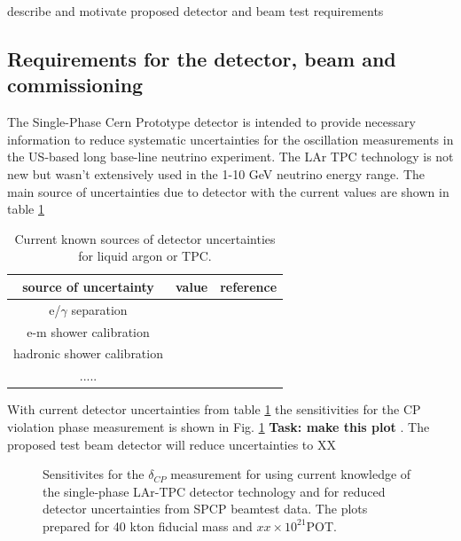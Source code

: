 describe and motivate proposed detector and beam test requirements 


\subsection{Requirements for the detector, beam and commissioning}
The Single-Phase Cern Prototype detector is intended to provide necessary information to reduce systematic uncertainties for the oscillation measurements in the US-based long base-line neutrino experiment.   The LAr TPC technology is not new but wasn't extensively used in the 1-10 GeV neutrino energy range.  The main source of uncertainties due to detector with the current values are shown in table \ref{table:deterr}


\begin{table}[h]
\centering


\caption{Current known sources of detector uncertainties for liquid argon or TPC.}
\label{table:deterr}
\begin{tabular}{|c|c|c|}

\hline
\textbf{source of uncertainty } & \textbf{value} & \textbf{reference}  \\ \hline
  e/$\gamma$ separation        &           &                   \\ \hline
  e-m shower calibration        &           &            \\ \hline
   hadronic shower calibration       &           &        \\ \hline
 .....   &   &   \\ \hline
\end{tabular}
\end{table}

With current detector uncertainties from table \ref{table:deterr} the sensitivities for the CP violation phase measurement is shown in Fig. \ref{fig:cpsensitivity}  {\bf Task: make this plot} . The  proposed test beam detector will reduce uncertainties to XX%



\begin{figure}[h!]
  \centering
\label{fig:cpsensitivity}
  \caption{Sensitivites for the $\delta_{CP}$ measurement  for using current knowledge of the single-phase LAr-TPC detector technology and for reduced detector uncertainties from SPCP beamtest data.  The plots prepared for 40 kton fiducial mass and $xx\times 10^{21}$POT.}
\end{figure}

